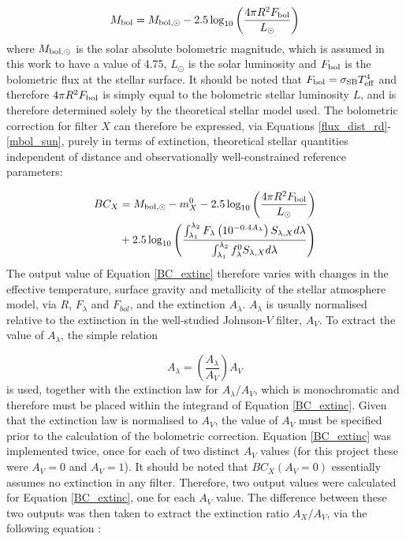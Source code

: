 \documentclass[12pt, a4paper]{report}
\begin{document}
\begin{equation}
M_{\textnormal{bol}} = M_{\textnormal{bol},\odot} - 2.5 \log_{10} \left( \frac{4\pi R^{2}F_{\textnormal{bol}}}{L_{\odot}} \right)
\label{mbol_sun}
\end{equation}
where $M_{\textnormal{bol},\odot}$ is the solar absolute bolometric magnitude, which is assumed in this work to have a value of 4.75, $L_{\odot}$ is the solar luminosity and $F_{\textnormal{bol}}$ is the bolometric flux at the stellar surface. It should be noted that $F_{\textnormal{bol}} = \sigma_{\textnormal{SB}} T_{\textnormal{eff}}^{4}$ and therefore $4\pi R^{2}F_{\textnormal{bol}}$ is simply equal to the bolometric stellar luminosity $L$, and is therefore determined solely by the theoretical stellar model used. The bolometric correction for filter $X$ can therefore be expressed, via Equations \ref{flux_dist_rd}-\ref{mbol_sun}, purely in terms of extinction, theoretical stellar quantities independent of distance and observationally well-constrained reference parameters:

\begin{align}
\begin{split}
BC_{X} &= M_{\textnormal{bol},\odot} - m_{X}^{0} - 2.5 \log_{10} \left( \frac{4\pi R^{2}F_{\textnormal{bol}}}{L_{\odot}} \right) \\
&+ 2.5 \log_{10} \left( \frac{\int_{\lambda_{1}}^{\lambda_{2}} F_{\lambda} \left( 10^{-0.4 A_{\lambda}} \right) S_{\lambda,X} d\lambda}{\int_{\lambda_{1}}^{\lambda_{2}} f_{\lambda}^{0} S_{\lambda,X} d\lambda} \right)
\label{BC_extinc}
\end{split}
\end{align}
The output value of Equation \ref{BC_extinc} therefore varies with changes in the effective temperature, surface gravity and metallicity of the stellar atmosphere model, via $R$, $F_{\lambda}$ and $F_{bol}$, and the extinction $A_{\lambda}$. $A_{\lambda}$ is usually normalised relative to the extinction in the well-studied Johnson-$V$ filter, $A_{V}$. To extract the value of $A_{\lambda}$, the simple relation

\begin{equation}
A_{\lambda} = \left( \frac{A_{\lambda}}{A_{V}} \right) A_{V}
\label{ratio_eq}
\end{equation}
is used, together with the \cite{1989ApJ...345..245C} extinction law for $A_{\lambda}/A_{V}$, which is monochromatic and therefore must be placed within the integrand of Equation \ref{BC_extinc}. Given that the \cite{1989ApJ...345..245C} extinction law is normalised to $A_{V}$, the value of $A_{V}$ must be specified prior to the calculation of the bolometric correction. Equation \ref{BC_extinc} was implemented twice, once for each of two distinct $A_{V}$ values (for this project these were $A_{V} = 0$ and $A_{V} = 1$). It should be noted that $BC_{X}(A_{V}=0)$ essentially assumes no extinction in any filter. Therefore, two output values were calculated for Equation \ref{BC_extinc}, one for each $A_{V}$ value. The difference between these two outputs was then taken to extract the extinction ratio $A_{X}/A_{V}$, via the following equation \citep{2008PASP..120..583G,2014MNRAS.444..392C}:
\end{document}
